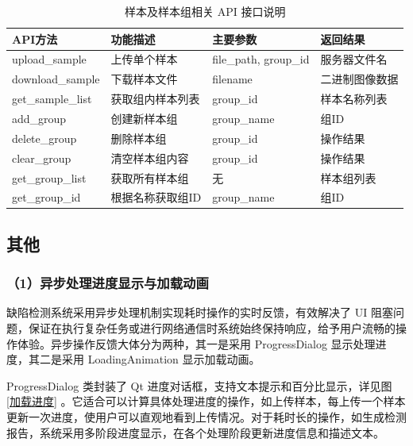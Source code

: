 \documentclass[
  ]{njuthesis}
\begin{document}
\begin{table}[H]
    \centering
    \caption{样本及样本组相关 API 接口说明}
    \label{sample_API}
    \renewcommand\arraystretch{0.5}
    \begin{tabular}{p{2.5cm}p{3.5cm}p{4cm}p{2.5cm}}
    \toprule[1.5pt]
    API方法 & 功能描述 & 主要参数 & 返回结果 \\
    \midrule[1pt]
    upload\_sample & 上传单个样本 & file\_path, group\_id & 服务器文件名 \\
    \midrule[0.5pt]
    download\_sample & 下载样本文件 & filename & 二进制图像数据 \\
    \midrule[0.5pt]
    get\_sample\_list & 获取组内样本列表 & group\_id & 样本名称列表 \\
    \midrule[0.5pt]
    add\_group & 创建新样本组 & group\_name & 组ID \\
    \midrule[0.5pt]
    delete\_group & 删除样本组 & group\_id & 操作结果 \\
    \midrule[0.5pt]
    clear\_group & 清空样本组内容 & group\_id & 操作结果 \\
    \midrule[0.5pt]
    get\_group\_list & 获取所有样本组 & 无 & 样本组列表 \\
    \midrule[0.5pt]
    get\_group\_id & 根据名称获取组ID & group\_name & 组ID \\
    \bottomrule[1.5pt]
    \end{tabular}
\end{table}


\subsection{其他}

\subsubsection{（1）异步处理进度显示与加载动画}

缺陷检测系统采用异步处理机制实现耗时操作的实时反馈，有效解决了 UI 阻塞问题，保证在执行复杂任务或进行网络通信时系统始终保持响应，给予用户流畅的操作体验。异步操作反馈大体分为两种，其一是采用 ProgressDialog 显示处理进度，其二是采用 LoadingAnimation 显示加载动画。

ProgressDialog 类封装了 Qt 进度对话框，支持文本提示和百分比显示，详见图 \ref{加载进度} 。它适合可以计算具体处理进度的操作，如上传样本，每上传一个样本更新一次进度，使用户可以直观地看到上传情况。对于耗时长的操作，如生成检测报告，系统采用多阶段进度显示，在各个处理阶段更新进度信息和描述文本。
\end{document}

